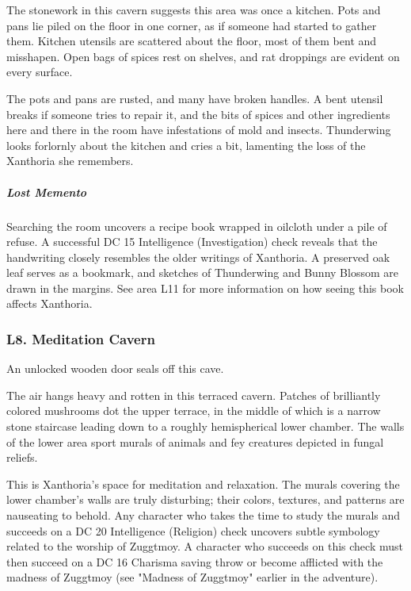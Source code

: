 \documentclass[10pt,a4paper,twoside,bg=print,twocolumn,openany,nodeprecatedcode]{dndbook}
\begin{document}
\begin{DndReadAloud}{}
The stonework in this cavern suggests this area was once a kitchen. Pots and pans lie piled on the floor in one corner, as if someone had started to gather them. Kitchen utensils are scattered about the floor, most of them bent and misshapen. Open bags of spices rest on shelves, and rat droppings are evident on every surface.

\end{DndReadAloud}

The pots and pans are rusted, and many have broken handles. A bent utensil breaks if someone tries to repair it, and the bits of spices and other ingredients here and there in the room have infestations of mold and insects. Thunderwing looks forlornly about the kitchen and cries a bit, lamenting the loss of the Xanthoria she remembers.

\subparagraph{Lost Memento}
Searching the room uncovers a recipe book wrapped in oilcloth under a pile of refuse. A successful DC 15 Intelligence (Investigation) check reveals that the handwriting closely resembles the older writings of Xanthoria. A preserved oak leaf serves as a bookmark, and sketches of Thunderwing and Bunny Blossom are drawn in the margins. See area L11 for more information on how seeing this book affects Xanthoria.

\subsubsection{L8. Meditation Cavern}
An unlocked wooden door seals off this cave.

\begin{DndReadAloud}{}
The air hangs heavy and rotten in this terraced cavern. Patches of brilliantly colored mushrooms dot the upper terrace, in the middle of which is a narrow stone staircase leading down to a roughly hemispherical lower chamber. The walls of the lower area sport murals of animals and fey creatures depicted in fungal reliefs.

\end{DndReadAloud}

This is Xanthoria's space for meditation and relaxation. The murals covering the lower chamber's walls are truly disturbing; their colors, textures, and patterns are nauseating to behold. Any character who takes the time to study the murals and succeeds on a DC 20 Intelligence (Religion) check uncovers subtle symbology related to the worship of Zuggtmoy. A character who succeeds on this check must then succeed on a DC 16 Charisma saving throw or become afflicted with the madness of Zuggtmoy (see "Madness of Zuggtmoy" earlier in the adventure).
\end{document}

